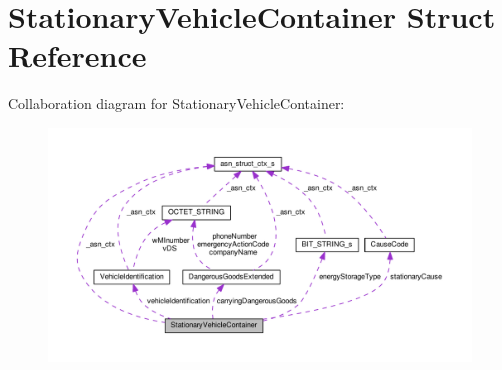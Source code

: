 \hypertarget{structStationaryVehicleContainer}{}\section{Stationary\+Vehicle\+Container Struct Reference}
\label{structStationaryVehicleContainer}


Collaboration diagram for Stationary\+Vehicle\+Container\+:\nopagebreak
\begin{figure}[H]
\begin{center}
\leavevmode
\includegraphics[width=350pt]{structStationaryVehicleContainer__coll__graph}
\end{center}
\end{figure}
